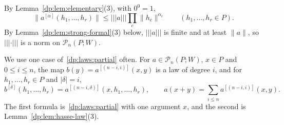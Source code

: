 \documentclass[11pt]{amsart}
\theoremstyle{definition}
\theoremstyle{remark}
\numberwithin{equation}{section}
\newcommand{\abs}[1]{\lvert #1\rvert}
\newcommand{\norm}[1]{\lVert #1\rVert}
\theoremstyle{plain}
\theoremstyle{definition}
\theoremstyle{plain}
\newcommand{\cP}{\mathcal P}
\begin{document}
By Lemma~\ref{dp:lem:elementary}(3), with $0^0=1$,
\begin{equation}\label{dp:laws:strong}
 \norm{a^{[\alpha]}(h_1,\dots,h_r)}\le\lvert\!\lvert\!\lvert a\rvert\!\rvert\!\rvert\prod_c\norm{h_c}^{\alpha_c}\qquad(h_1,\dots,h_r\in P).
\end{equation}
By Lemma~\ref{dp:lem:strong-formal}(3) below, $\lvert\!\lvert\!\lvert a\rvert\!\rvert\!\rvert$ is finite and at least $\norm a$, so $\lvert\!\lvert\!\lvert\cdot\rvert\!\rvert\!\rvert$ is a norm on $\cP_n(P;W)$.

We use one case of~\eqref{dp:laws:partial} often. For $a\in\cP_n(P;W)$, $x\in P$ and $0\le i\le n$, the map $b(y)=a^{[(n-i,i)]}(x,y)$ is a law of degree $i$, and for $h_1,\dots,h_r\in P$ and $\abs\delta=i$,
\begin{equation}\label{dp:eq:coefficient-identity}
 b^{[\delta]}(h_1,\dots,h_r)=a^{[(n-i,\delta)]}(x,h_1,\dots,h_r),\qquad a(x+y)=\sum_{i\le n}a^{[(n-i,i)]}(x,y).
\end{equation}
The first formula is~\eqref{dp:laws:partial} with one argument $x$, and the second is Lemma~\ref{dp:lem:hasse-law}(3).
\end{document}
